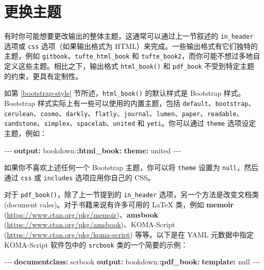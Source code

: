\documentclass[
  12pt,
]{krantz}
\newenvironment{Shaded}{\begin{snugshade}}{\end{snugshade}}
\newcommand{\AttributeTok}[1]{\textcolor[rgb]{0.13,0.29,0.53}{#1}}
\newcommand{\CharTok}[1]{\textcolor[rgb]{0.31,0.60,0.02}{#1}}
\newcommand{\FunctionTok}[1]{\textcolor[rgb]{0.13,0.29,0.53}{\textbf{#1}}}
\newcommand{\KeywordTok}[1]{\textcolor[rgb]{0.13,0.29,0.53}{\textbf{#1}}}
\newcommand{\PreprocessorTok}[1]{\textcolor[rgb]{0.56,0.35,0.01}{\textit{#1}}}
\theoremstyle{definition}
\theoremstyle{definition}
\theoremstyle{definition}
\theoremstyle{definition}
\theoremstyle{remark}
\begin{document}
\hypertarget{ux66f4ux6362ux4e3bux9898}{%
\section{更换主题}\label{ux66f4ux6362ux4e3bux9898}}

有时你可能想要更改输出的整体主题，这通常可以通过上一节叙述的 \texttt{in\_header} 选项或 \texttt{css} 选项（如果输出格式为 HTML）来完成。一些输出格式有它们独特的主题，例如 \texttt{gitbook}、\texttt{tufte\_html\_book} 和 \texttt{tufte\_book2}，而你可能不想过多地自定义这些主题。相比之下，输出格式 \texttt{html\_book()} 和 \texttt{pdf\_book} 不受到特定主题的约束，更具有定制性。

如第 \ref{bootstrap-style} 节所述，\texttt{html\_book()} 的默认样式是 Bootstrap 样式。Bootstrap 样式实际上有一些可以使用的内置主题，包括 \texttt{default}、\texttt{bootstrap}、\texttt{cerulean}、\texttt{cosmo}、\texttt{darkly}、\texttt{flatly}、\texttt{journal}、\texttt{lumen}、\texttt{paper}、\texttt{readable}、\texttt{sandstone}、\texttt{simplex}、\texttt{spacelab}、\texttt{united} 和 \texttt{yeti}。你可以通过 \texttt{theme} 选项设定主题，例如：

\begin{Shaded}
\begin{Highlighting}[]
\PreprocessorTok{{-}{-}{-}}
\FunctionTok{output}\KeywordTok{:}
\AttributeTok{  bookdown:}\FunctionTok{:html\_book}\KeywordTok{:}
\AttributeTok{    }\FunctionTok{theme}\KeywordTok{:}\AttributeTok{ united}
\PreprocessorTok{{-}{-}{-}}
\end{Highlighting}
\end{Shaded}

如果你不喜欢上述任何一个 Bootstrap 主题，你可以将 \texttt{theme} 设置为 \texttt{null}，然后通过 \texttt{css} 或 \texttt{includes} 选项应用你自己的 CSS。

对于 \texttt{pdf\_book()}，除了上一节提到的 \texttt{in\_header} 选项，另一个方法是改变文档类 (document calss)。对于书籍来说有许多可用的 LaTeX 类，例如 \textbf{memoir} (\url{https://www.ctan.org/pkg/memoir})、\textbf{amsbook} (\url{https://www.ctan.org/pkg/amsbook})、KOMA-Script (\url{https://www.ctan.org/pkg/koma-script}) 等等。以下是在 YAML 元数据中指定 KOMA-Script 软件包中的 \texttt{srcbook} 类的一个简要的示例：

\begin{Shaded}
\begin{Highlighting}[]
\PreprocessorTok{{-}{-}{-}}
\FunctionTok{documentclass}\KeywordTok{:}\AttributeTok{ scrbook}
\FunctionTok{output}\KeywordTok{:}
\AttributeTok{  bookdown:}\FunctionTok{:pdf\_book}\KeywordTok{:}
\AttributeTok{    }\FunctionTok{template}\KeywordTok{:}\AttributeTok{ }\CharTok{null}
\PreprocessorTok{{-}{-}{-}}
\end{Highlighting}
\end{Shaded}
\end{document}
